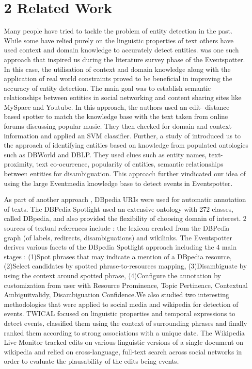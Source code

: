 \documentclass[a4paper,11pt]{report}
\begin{document}
\chapter*{2 Related Work}
Many people have tried to tackle the problem of entity detection in the past. While some have relied purely on the linguistic properties of text others have used context and domain knowledge to accurately detect entities. \cite{Gruhl_contextand} was one such approach that inspired us during the literature survey phase of the Eventspotter. In this case, the utilisation of context and domain knowledge along with the application of real world constraints proved to be beneficial in improving the accuracy of entity detection. The main goal was to establish semantic relationships between entities in social networking and content sharing sites like MySpace and Youtube. In this approach, the authors used an edit- distance based spotter to match the knowledge base with the text taken from online forums discussing popular music. They then checked for domain and context information and applied an SVM classifier. Further, a study of \cite{Hassell06ontology-drivenautomatic} introduced us to the approach of identifying entities based on knowledge from populated ontologies such as DBWorld and DBLP. They used clues such as entity names, text-proximity, text co-ocurrence, popularity of entities, semantic relationships between entities for disambiguation. This approach further vindicated our idea of using the large Eventmedia knowledge base to detect events in Eventspotter.\newline

As part of another approach , DBpedia URIs were used for automatic annotation of texts. The DBPedia Spotlight \cite{Mendes11dbpediaspotlight:} used an extensive ontology with 272 classes, called DBpedia, and also provided the flexibility of choosing domain of interest. 2 sources of textual references include : the lexicon created from the DBPedia graph (of labels, redirects, disambiguations) and wikilinks. The Eventspotter derives various facets of the DBpedia Spotlight approach including the 4 main stages : (1)Spot phrases that may indicate a mention of a DBpedia resource, (2)Select candidates by spotted phrase-to-resources mapping, (3)Disambiguate by using the context around spotted phrase, (4)Configure the annotation by customization from user with Resource Prominence, Topic Pertinence, Contextual Ambiguitvalidy, Disambiguation Confidence.We also studied two interesting methodologies that were applied to social media and wikipedia for detection of events. TWICAL \cite{Ritter_opendomain} focused on linguistic properties and temporal expressions to detect events, classified them using the context of surrounding phrases and finally ranked them according to strong associations with a unique date. The Wikipedia Live Monitor\cite{DBLP:journals/corr/abs-1303-4702} tracked edits on various linguistic versions of a single document on wikipedia and relied on cross-language, full-text search across social networks in order to evaluate the \cite{Hassell06ontology-drivenautomatic} plausability of the edits being events. \newline
\end{document}

